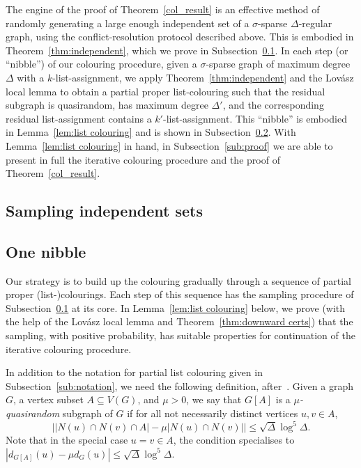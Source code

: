 \documentclass[11pt]{article}
\theoremstyle{plain}
\begin{document}
The engine of the proof of Theorem~\ref{col_result} is an effective method of randomly generating a large enough independent set of a $\sigma$-sparse $\Delta$-regular graph, using the conflict-resolution protocol described above. This is embodied in Theorem~\ref{thm:independent}, which we prove in Subsection~\ref{sub:generating independent set}.
In each step (or ``nibble'') of our colouring procedure, given a $\sigma$-sparse graph of maximum degree $\Delta$ with a $k$-list-assignment, we apply Theorem~\ref{thm:independent} and the Lov\'asz local lemma to obtain a partial proper list-colouring such that the residual subgraph is quasirandom, has maximum degree $\Delta'$, and the corresponding residual list-assignment contains a $k'$-list-assignment.
This ``nibble'' is embodied in Lemma~\ref{lem:list colouring} and is shown in Subsection~\ref{sub:list colouring}.
With Lemma~\ref{lem:list colouring} in hand, in Subsection~\ref{sub:proof} we are able to present in full the iterative colouring procedure and the proof of Theorem~\ref{col_result}.


\subsection{Sampling independent sets}\label{sub:generating independent set}




\subsection{One nibble}\label{sub:list colouring}


Our strategy is to build up the colouring gradually through a sequence of partial proper (list-)colourings. Each step of this sequence has the sampling procedure of Subsection~\ref{sub:generating independent set} at its core. In Lemma~\ref{lem:list colouring} below, we prove (with the help of the Lov\'asz local lemma and Theorem~\ref{thm:downward certs}) that the sampling, with positive probability, has suitable properties for continuation of the iterative colouring procedure.

In addition to the notation for partial list colouring given in Subsection~\ref{sub:notation}, we need the following definition, after~\cite{BPP18+}.
Given a graph $G$, a vertex subset $A\subseteq V(G)$, and $\mu>0$, we say that $G[A]$ is a {\em $\mu$-quasirandom} subgraph of $G$ if for all not necessarily distinct vertices $u,v\in A$,
\[
\left||N(u)\cap N(v) \cap A|-\mu|N(u)\cap N(v)|\right|\le \sqrt{\Delta}\log^5\Delta.
\]
Note that in the special case $u=v\in A$, the condition specialises to $|d_{G[A]}(u)-\mu d_G(u)| \le \sqrt{\Delta}\log^5\Delta$.
 
\end{document}

